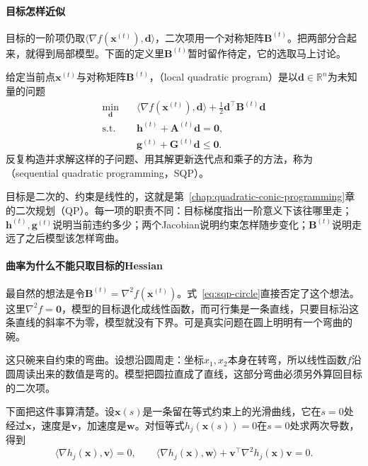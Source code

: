 \paragraph{目标怎样近似}
目标的一阶项仍取$\langle\nabla f(\bm{x}^{(t)}),\bm{d}\rangle$，二次项用一个对称矩阵$\bm{B}^{(t)}$。把两部分合起来，就得到局部模型。下面的定义里$\bm{B}^{(t)}$暂时留作待定，它的选取马上讨论。

\begin{definition}[局部二次规划与SQP]
\label{def:sqp-subproblem}
给定当前点$\bm{x}^{(t)}$与对称矩阵$\bm{B}^{(t)}$，（local quadratic program）是以$\bm{d}\in\mathbb{R}^n$为未知量的问题
\begin{equation}
 \begin{aligned}
 \min_{\bm{d}}\quad & \langle\nabla f(\bm{x}^{(t)}),\bm{d}\rangle+\frac12\bm{d}^\top\bm{B}^{(t)}\bm{d}\\
 \text{s.t.}\quad & \bm{h}^{(t)}+\bm{A}^{(t)}\bm{d}=\bm{0},\\
 & \bm{g}^{(t)}+\bm{G}^{(t)}\bm{d}\leq\bm{0}.
 \end{aligned}
 \label{eq:sqp-qp}
\end{equation}
反复构造并求解这样的子问题、用其解更新迭代点和乘子的方法，称为（sequential quadratic programming，SQP）。
\end{definition}

目标是二次的、约束是线性的，这就是第~\ref{chap:quadratic-conic-programming}章的二次规划（QP）。每一项的职责不同：目标梯度指出一阶意义下该往哪里走；$\bm{h}^{(t)},\bm{g}^{(t)}$说明当前违约多少；两个Jacobian说明约束怎样随步变化；$\bm{B}^{(t)}$说明走远了之后模型该怎样弯曲。

\paragraph{曲率为什么不能只取目标的Hessian}
最自然的想法是令$\bm{B}^{(t)}=\nabla^2f(\bm{x}^{(t)})$。式~\eqref{eq:sqp-circle}直接否定了这个想法。这里$\nabla^2f=\bm{0}$，模型的目标退化成线性函数，而可行集是一条直线，只要目标沿这条直线的斜率不为零，模型就没有下界。可是真实问题在圆上明明有一个弯曲的碗。

这只碗来自约束的弯曲。设想沿圆周走：坐标$x_1,x_2$本身在转弯，所以线性函数$f$沿圆周读出来的数值是弯的。模型把圆拉直成了直线，这部分弯曲必须另外算回目标的二次项。

下面把这件事算清楚。设$\bm{x}(s)$是一条留在等式约束上的光滑曲线，它在$s=0$处经过$\bm{x}$，速度是$\bm{v}$，加速度是$\bm{w}$。对恒等式$h_j(\bm{x}(s))=0$在$s=0$处求两次导数，得到
\[
 \langle\nabla h_j(\bm{x}),\bm{v}\rangle=0,\qquad
 \langle\nabla h_j(\bm{x}),\bm{w}\rangle+\bm{v}^\top\nabla^2h_j(\bm{x})\bm{v}=0.
\]

